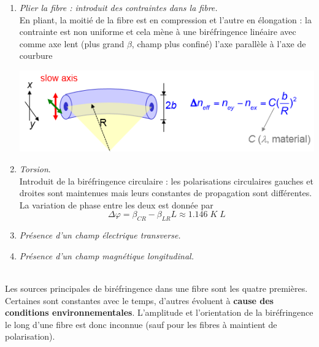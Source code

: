 \begin{enumerate}
\item \textit{Plier la fibre : introduit des contraintes dans la fibre.}\\
En pliant, la moitié de la fibre est en compression et l'autre en élongation : la contrainte est 
non uniforme et cela mène à une biréfringence linéaire avec comme axe lent (plus grand $\beta$, champ
plus confiné) l'axe parallèle à l'axe
de courbure
	\begin{center}
		\includegraphics[scale=0.65]{ch1/image47}
	\end{center}	
	
\item \textit{Torsion}.\\
Introduit de la biréfringence circulaire : les polarisations circulaires gauches et droites sont 
maintenues mais leurs constantes de propagation sont différentes. La variation de phase entre les
deux est donnée par
\begin{equation}
\Delta \varphi  = {\beta _{CR}} - {\beta _{LR}}L \approx 1.146\;K\;L
\end{equation}

\item \textit{Présence d'un champ électrique transverse.}
\item \textit{Présence d'un champ magnétique longitudinal.}
\end{enumerate}\ \\

Les sources principales de biréfringence dans une fibre sont les quatre premières. Certaines sont
constantes avec le temps, d'autres évoluent à \textbf{cause des conditions environnementales}. 
L'amplitude et l'orientation de la biréfringence le long d'une fibre est donc inconnue (sauf pour
les fibres à maintient de polarisation). 

